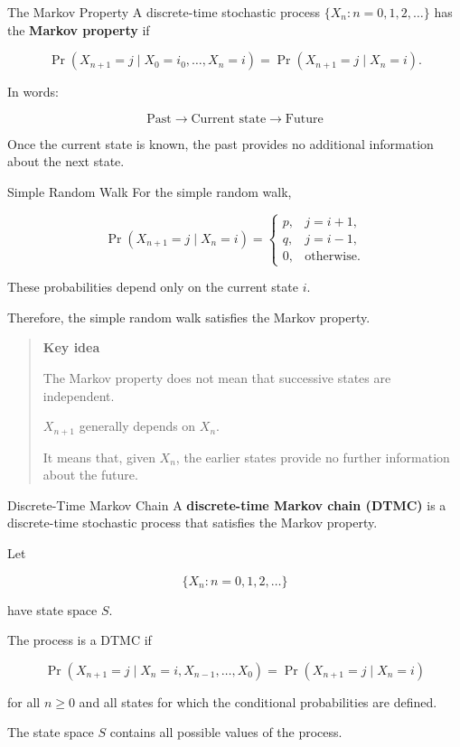 \documentclass[
  ignorenonframetext,
  aspectratio=169,
]{beamer}
\begin{document}
\begin{frame}{The Markov Property}
\protect{}\label{the-markov-property-1}
A discrete-time stochastic process \(\{X_n:n=0,1,2,\ldots\}\) has the
\textbf{Markov property} if

\[
\boxed{
\Pr(X_{n+1}=j\mid X_0=i_0,\ldots,X_n=i)
=\Pr(X_{n+1}=j\mid X_n=i).
}
\]

In words:

\[
\boxed{
\text{Past}
\longrightarrow
\text{Current state}
\longrightarrow
\text{Future}
}
\]

Once the current state is known, the past provides no additional
information about the next state.
\end{frame}

\begin{frame}{Simple Random Walk}
\protect{}\label{simple-random-walk}
For the simple random walk,

\[
\Pr(X_{n+1}=j\mid X_n=i)
=\begin{cases}
p, & j=i+1,\\
q, & j=i-1,\\
0, & \text{otherwise}.
\end{cases}
\]

These probabilities depend only on the current state \(i\).

Therefore, the simple random walk satisfies the Markov property.

\begin{quote}
\textbf{Key idea}

The Markov property does not mean that successive states are
independent.

\(X_{n+1}\) generally depends on \(X_n\).

It means that, given \(X_n\), the earlier states provide no further
information about the future.
\end{quote}
\end{frame}

\begin{frame}{Discrete-Time Markov Chain}
\protect{}\label{discrete-time-markov-chain}
A \textbf{discrete-time Markov chain (DTMC)} is a discrete-time
stochastic process that satisfies the Markov property.

Let

\[
\{X_n:n=0,1,2,\ldots\}
\]

have state space \(S\).

The process is a DTMC if

\[
\boxed{
\Pr(X_{n+1}=j\mid X_n=i,X_{n-1},\ldots,X_0)
=\Pr(X_{n+1}=j\mid X_n=i)
}
\]

for all \(n\geq0\) and all states for which the conditional
probabilities are defined.

The state space \(S\) contains all possible values of the process.
\end{frame}
\end{document}
